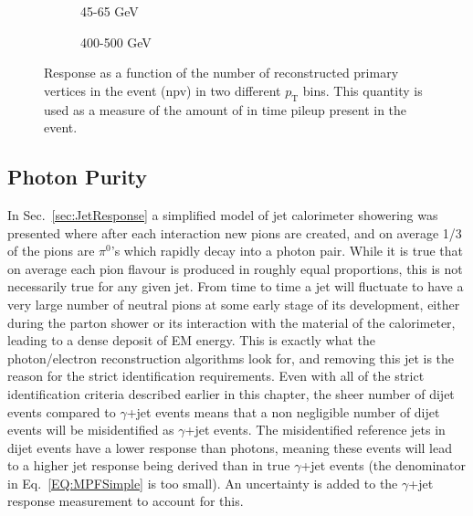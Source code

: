 \begin{figure}[!ht]
  \centering
  \begin{subfigure}{.5\textwidth}
    \centering
    \caption{45-65 GeV}
  \end{subfigure}%
  \begin{subfigure}{.5\textwidth}
    \centering
    \caption{400-500 GeV}
  \end{subfigure}
  \caption[Response as a function of npv for two $p_{\mathrm{T}}$ bins]
  {\small Response as a function of the number of reconstructed primary vertices in the event (npv) in two different $p_{\mathrm T}$ bins.  This quantity is used as a measure of the amount of in time pileup present in the event.  }
  \label{Fig:RespVsNPVJetEM2016}
\end{figure}


\subsection{Photon Purity}
\label{Sec:purity}
In Sec.~\ref{sec:JetResponse} a simplified model of jet calorimeter showering was presented where after each interaction new pions are created, and on average 1/3 of the pions are $\pi^0$'s which rapidly decay into a photon pair.  
While it is true that on average each pion flavour is produced in roughly equal proportions, this is not necessarily true for any given jet.  
From time to time a jet will fluctuate to have a very large number of neutral pions at some early stage of its development, either during the parton shower or its interaction with the material of the calorimeter, leading to a dense deposit of EM energy.  
This is exactly what the photon/electron reconstruction algorithms look for, and removing this jet is the reason for the strict identification requirements.  
Even with all of the strict identification criteria described earlier in this chapter, the sheer number of dijet events compared to $\gamma$+jet events means that a non negligible number of dijet events will be misidentified as $\gamma$+jet events.  
The misidentified reference jets in dijet events have a lower response than photons, meaning these events will lead to a higher jet response being derived than in true $\gamma$+jet events (the denominator in Eq.~\ref{EQ:MPFSimple} is too small).  
An uncertainty is added to the $\gamma$+jet response measurement to account for this.  

